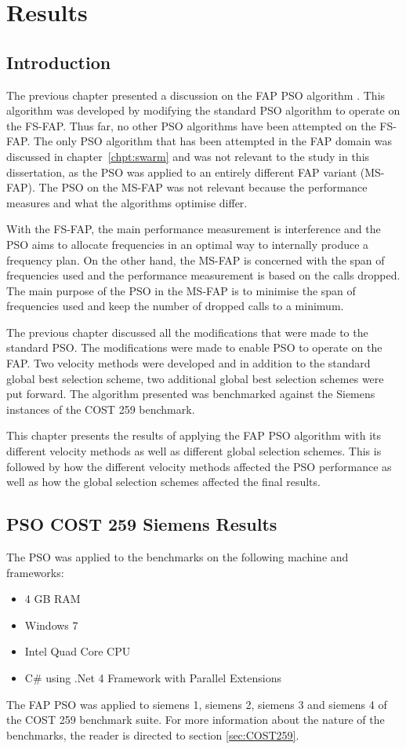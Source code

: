 \chapter{Results}
\label{chpt:results}
\section{Introduction}
The previous chapter presented a discussion on the FAP PSO algorithm . This algorithm was developed by modifying the standard PSO algorithm to operate on the FS-FAP. Thus far, no other PSO algorithms have been attempted on the FS-FAP. The only PSO algorithm that has been attempted in the FAP domain was discussed in chapter~\ref{chpt:swarm} and was not relevant to the study in this dissertation, as the PSO was applied to an entirely different FAP variant (MS-FAP). The PSO on the MS-FAP was not relevant because the performance measures and what the algorithms optimise differ.

With the FS-FAP, the main performance measurement is interference and the PSO aims to allocate frequencies in an optimal way to internally produce a frequency plan. On the other hand, the MS-FAP is concerned with the span of frequencies used and the performance measurement is based on the calls dropped. The main purpose of the PSO in the MS-FAP is to minimise the span of frequencies used and keep the number of dropped calls to a minimum.

The previous chapter discussed all the modifications that were made to the standard PSO. The modifications were made to enable PSO to operate on the FAP. Two velocity methods were developed and in addition to the standard global best selection scheme, two additional global best selection schemes were put forward. The algorithm presented was benchmarked against the Siemens instances of the COST 259 benchmark.

This chapter presents the results of applying the FAP PSO algorithm with its different velocity methods as well as different global selection schemes. This is followed by how the different velocity methods affected the PSO performance as well as how the global selection schemes affected the final results.

\section{PSO COST 259 Siemens Results}
The PSO was applied to the benchmarks on the following machine and frameworks:
\begin{itemize}
\item 4 GB RAM
\item Windows 7
\item Intel Quad Core CPU
\item C\# using .Net 4 Framework with Parallel Extensions
\end{itemize}
The FAP PSO was applied to siemens 1, siemens 2, siemens 3 and siemens 4 of the COST 259 benchmark suite. For more information about the nature of the benchmarks, the reader is directed to section \ref{sec:COST259}.

